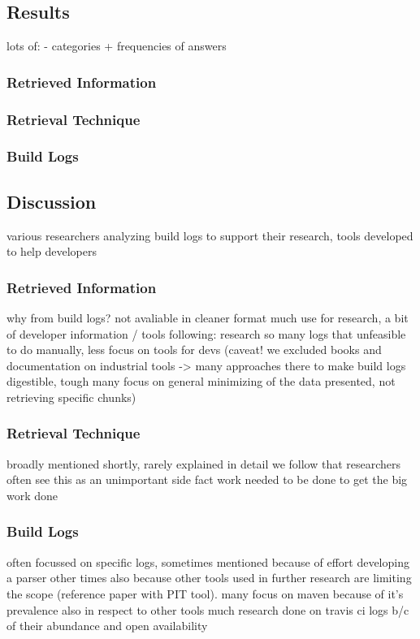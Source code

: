 \subsection{Results}
lots of:
- categories + frequencies of answers

\subsubsection{Retrieved Information}

\subsubsection{Retrieval Technique}

\subsubsection{Build Logs}

\subsection{Discussion}
various researchers analyzing build logs to support their research,
tools developed to help developers %

\subsubsection{Retrieved Information}
why from build logs? not avaliable in cleaner format much use for
research, a bit of developer information / tools following: research
so many logs that unfeasible to do manually, less focus on tools for
devs (caveat! we excluded books and documentation on industrial tools
-> many approaches there to make build logs digestible, tough many
focus on general minimizing of the data presented, not retrieving
specific chunks)

\subsubsection{Retrieval Technique}
broadly mentioned shortly, rarely explained in detail we follow that
researchers often see this as an unimportant side fact work needed to
be done to get the big work done

\subsubsection{Build Logs}
often focussed on specific logs, sometimes mentioned because of effort
developing a parser other times also because other tools used in
further research are limiting the scope (reference paper with PIT
tool).
many focus on maven because of it's prevalence also in respect
to other tools much research done on travis ci logs b/c of their
abundance and open availability

